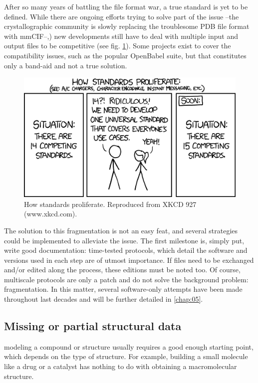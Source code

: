 After so many years of battling the file format war, a true standard is yet to be defined. While there are ongoing efforts trying to solve part of the issue --the crystallographic community is slowly replacing the troublesome PDB file format with mmCIF--,\cite{bourne1997,berman2007}) new developments still have to deal with multiple input and output files to be competitive (see fig. \ref{fig:xkcd}). Some projects exist to cover the compatibility issues, such as the popular OpenBabel suite, \cite{oboyle2011} but that constitutes only a band-aid and not a true solution.

\begin{figure}[H]
	\includegraphics[width=\textwidth]{./figures/01/xkcd927.png}
	\caption[Proliferation of standards]{How standards proliferate. Reproduced from XKCD 927 (www.xkcd.com).}
	\label{fig:xkcd}
\end{figure}



The solution to this fragmentation is not an easy feat, and several strategies could be implemented to alleviate the issue. The first milestone is, simply put, write good documentation: time-tested protocols, which detail the software and versions used in each step are of utmost importance. If files need to be exchanged and/or edited along the process, these editions must be noted too. Of course, multiscale protocols are only a patch and do not solve the background problem: fragmentation. In this matter, several software-only attempts have been made throughout last decades and will be further detailed in \autoref{chap:05}.

\subsection{Missing or partial structural data}
modeling a compound or structure usually requires a good enough starting point, which depends on the type of structure. For example, building a small molecule like a drug or a catalyst has nothing to do with obtaining a macromolecular structure.

